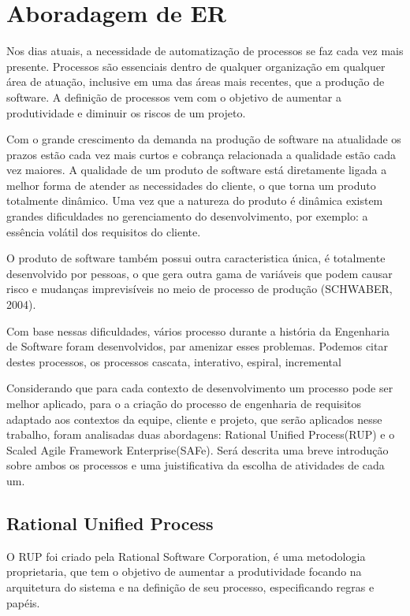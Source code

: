 \chapter[Aboradagem de ER]{Aboradagem de ER}\label{cap3}

Nos dias atuais, a necessidade de automatização de processos se faz cada vez mais
presente. Processos são essenciais dentro de qualquer organização em qualquer área
de atuação, inclusive em uma das áreas mais recentes, que a produção de software.
A definição de processos vem com o objetivo de aumentar a produtividade e diminuir
os riscos de um projeto.

Com o grande crescimento da demanda na produção de software
na atualidade os prazos estão cada vez mais curtos e cobrança relacionada a qualidade
estão cada vez maiores. A qualidade de um produto de software está diretamente ligada
a melhor forma de atender as necessidades do cliente, o que torna um produto totalmente dinâmico.
Uma vez que a natureza do produto é dinâmica existem grandes dificuldades no gerenciamento
do desenvolvimento, por exemplo: a essência volátil dos requisitos do cliente.

O produto de software também possui outra caracteristica única, é totalmente desenvolvido
por pessoas, o que gera outra gama de variáveis que podem causar risco e mudanças
imprevisíveis no meio de processo de produção (SCHWABER, 2004).

Com base nessas dificuldades, vários processo durante a história da Engenharia de
Software foram desenvolvidos, par amenizar esses problemas. Podemos citar destes
processos, os processos cascata, interativo, espiral, incremental

Considerando que para cada contexto de desenvolvimento um processo pode ser melhor
aplicado, para o a criação do processo de engenharia de requisitos adaptado aos
contextos da equipe, cliente e projeto, que serão aplicados nesse trabalho, foram
analisadas duas abordagens: Rational Unified Process(RUP) e o Scaled Agile Framework
Enterprise(SAFe). Será descrita uma breve introdução sobre ambos os processos e uma
juistificativa da escolha de atividades de cada um.

\section{Rational Unified Process}

O RUP foi criado pela Rational Software Corporation, é uma metodologia proprietaria,
que tem o objetivo de aumentar a produtividade focando na arquitetura do sistema
e na definição de seu processo, especificando regras e papéis.

